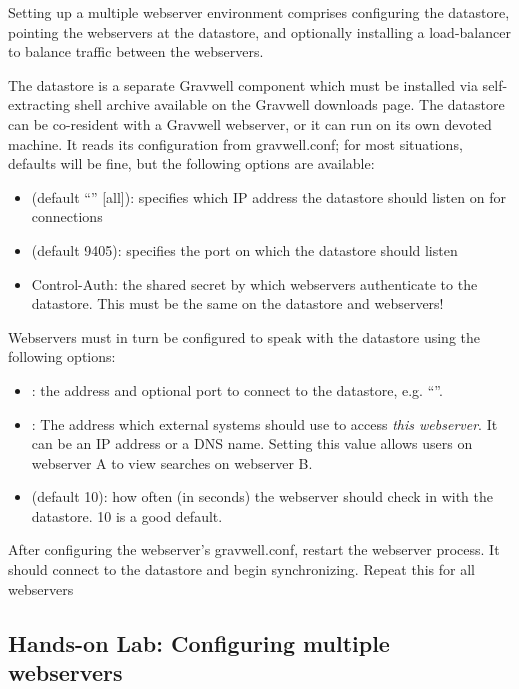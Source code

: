 Setting up a multiple webserver environment comprises configuring the
datastore, pointing the webservers at the datastore, and optionally
installing a load-balancer to balance traffic between the webservers.

The datastore is a separate Gravwell component which must be installed
via self-extracting shell archive available on the Gravwell downloads
page. The datastore can be co-resident with a Gravwell webserver, or it
can run on its own devoted machine. It reads its configuration from
gravwell.conf; for most situations, defaults will be fine, but the following
options are available:

\begin{itemize}
\item
   (default ``'' [all]): specifies which
  IP address the datastore should listen on for connections
\item
   (default 9405): specifies the port on which the
  datastore should listen
\item
  Control-Auth: the shared secret by which webservers authenticate to
  the datastore. This must be the same on the datastore and webservers!
\end{itemize}

Webservers must in turn be configured to speak with the datastore using
the following options:

\begin{itemize}
\item
  : the address and optional port to connect to the
  datastore, e.g. ``''.
\item
  : The address which external systems should use to
  access \emph{this webserver}. It can be an IP address or a DNS name.
  Setting this value allows users on webserver A to view searches on
  webserver B.
\item
   (default 10): how often (in seconds) the
  webserver should check in with the datastore. 10 is a good default.
\end{itemize}

After configuring the webserver's gravwell.conf, restart the webserver
process. It should connect to the datastore and begin synchronizing.
Repeat this for all webservers

\subsection{Hands-on Lab: Configuring multiple webservers}


